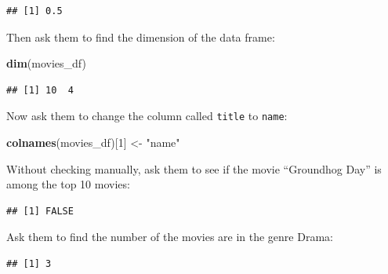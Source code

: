 \documentclass[]{book}
\newenvironment{Shaded}{\begin{snugshade}}{\end{snugshade}}
\newcommand{\DecValTok}[1]{\textcolor[rgb]{0.00,0.00,0.81}{#1}}
\newcommand{\KeywordTok}[1]{\textcolor[rgb]{0.13,0.29,0.53}{\textbf{#1}}}
\newcommand{\NormalTok}[1]{#1}
\newcommand{\OperatorTok}[1]{\textcolor[rgb]{0.81,0.36,0.00}{\textbf{#1}}}
\newcommand{\StringTok}[1]{\textcolor[rgb]{0.31,0.60,0.02}{#1}}
\begin{document}
\begin{verbatim}
## [1] 0.5
\end{verbatim}

Then ask them to find the dimension of the data frame:

\begin{Shaded}
\begin{Highlighting}[]
\KeywordTok{dim}\NormalTok{(movies_df)}
\end{Highlighting}
\end{Shaded}

\begin{verbatim}
## [1] 10  4
\end{verbatim}

Now ask them to change the column called \texttt{title} to \texttt{name}:

\begin{Shaded}
\begin{Highlighting}[]
\KeywordTok{colnames}\NormalTok{(movies_df)[}\DecValTok{1}\NormalTok{] <-}\StringTok{ "name"}
\end{Highlighting}
\end{Shaded}

Without checking manually, ask them to see if the movie ``Groundhog Day'' is among the top 10 movies:

\begin{Shaded}
\end{Shaded}

\begin{verbatim}
## [1] FALSE
\end{verbatim}

Ask them to find the number of the movies are in the genre Drama:

\begin{Shaded}
\end{Shaded}

\begin{verbatim}
## [1] 3
\end{verbatim}
\end{document}
